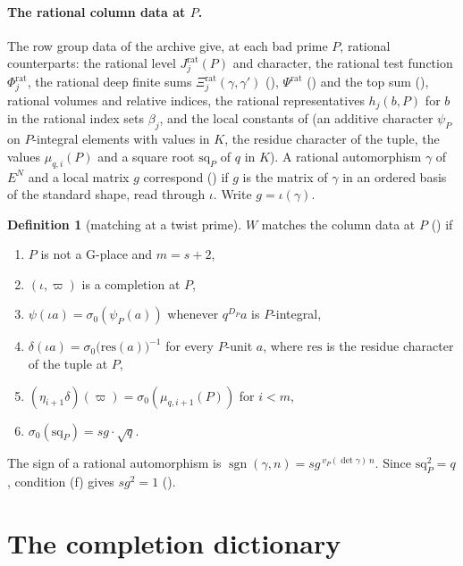 \documentclass[11pt]{article}
\newcommand{\sgn}{\operatorname{sgn}}
\theoremstyle{definition}
\newtheorem{definition}[theorem]{Definition}
\theoremstyle{remark}
\begin{document}
\paragraph{The rational column data at $P$.} The row group data of the archive give, at each bad prime $P$, rational counterparts: the rational level $J^{\mathrm{rat}}_j(P)$ and character, the rational test function $\Phi^{\mathrm{rat}}_j$, the rational deep finite sums $\Xi^{\mathrm{rat}}_j(\gamma,\gamma')$ (), $\Psi^{\mathrm{rat}}$ () and the top sum (), rational volumes and relative indices, the rational representatives $h_j(b,P)$ for $b$ in the rational index sets $\beta_j$, and the local constants of  (an additive character $\psi_P$ on $P$-integral elements with values in $K$, the residue character of the tuple, the values $\mu_{q,i}(P)$ and a square root $\mathrm{sq}_P$ of $q$ in $K$). A rational automorphism $\gamma$ of $E^{N}$ and a local matrix $g$ correspond () if $g$ is the matrix of $\gamma$ in an ordered basis of the standard shape, read through $\iota$. Write $g=\iota(\gamma)$.

\begin{definition}[matching at a twist prime]\label{def:at}
$W$ matches the column data at $P$ () if
\begin{enumerate}[label=(\alph*),itemsep=1pt]
\item $P$ is not a G-place and $m=s+2$,
\item $(\iota,\varpi)$ is a completion at $P$,
\item $\psi(\iota a)=\sigma_0(\psi_P(a))$ whenever $q^{D_P}a$ is $P$-integral,
\item $\delta(\iota a)=\sigma_0\big(\mathrm{res}(a)\big)^{-1}$ for every $P$-unit $a$, where $\mathrm{res}$ is the residue character of the tuple at $P$,
\item $(\eta_{i+1}\delta)(\varpi)=\sigma_0(\mu_{q,i+1}(P))$ for $i<m$,
\item $\sigma_0(\mathrm{sq}_P)=sg\cdot\sqrt q$.
\end{enumerate}
The sign of a rational automorphism is $\sgn(\gamma,n)=sg^{\,v_P(\det\gamma)\,n}$. Since $\mathrm{sq}_P^2=q$, condition (f) gives $sg^2=1$ ().
\end{definition}

\section{The completion dictionary}\label{sec:C}
\end{document}
